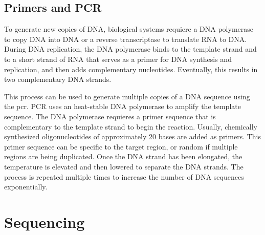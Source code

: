 \subsection{Primers and PCR}
To generate new copies of DNA, biological systems requiere a DNA polymerase to copy DNA into DNA or a reverse transcriptase to translate RNA to DNA. During DNA replication, the DNA polymerase binds to the template strand and to a short strand of RNA that serves as a primer for DNA synthesis and replication, and then adds complementary nucleotides. Eventually, this results in two complementary DNA strands\cite{alberts2014molecular}.

This process can be used to generate multiple copies of a DNA sequence using the \gls{pcr}. PCR uses an heat-stable DNA polymerase to amplify the template sequence. The DNA polymerase requieres a primer sequence that is complementary to the template strand to begin the reaction. Usually, chemically synthesized oligonucleotides of approximately 20 bases are added as primers. This primer sequence can be specific to the target region, or random if multiple regions are being duplicated. Once the DNA strand has been elongated, the temperature is elevated and then lowered to separate the DNA strands. The process is repeated multiple times to increase the number of DNA sequences exponentially\cite{alberts2014molecular}.



\section{Sequencing} 





